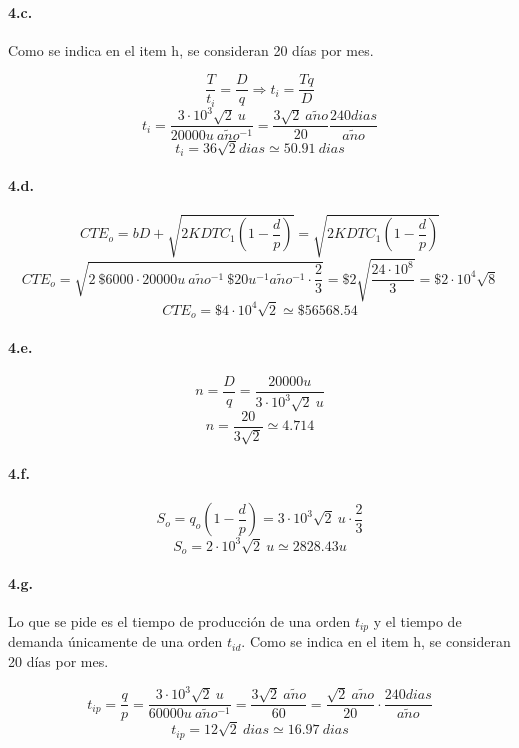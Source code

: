 \documentclass{article}
\def \anio {a\tilde{n}o}
\begin{document}
    \paragraph{4.c.}
        Como se indica en el item h, se consideran 20 días por mes.
        
        $$ \frac{T}{t_i} = \frac{D}{q} \Rightarrow t_i = \frac{Tq}{D} $$
        $$ t_i = \frac{3 \cdot 10^3 \sqrt{2}\ u}{20000u\ \anio^{-1}} = \frac{3 \sqrt{2}\ \anio}{20} \frac{240 dias}{\anio} $$
        $$ \boxed{ t_i = 36 \sqrt{2} dias \simeq 50.91\ dias } $$
    
    \paragraph{4.d.}
        $$ CTE_o = bD + \sqrt{ 2KDTC_1 \left( 1 - \frac{d}{p} \right) } = \sqrt{ 2KDTC_1 \left( 1 - \frac{d}{p} \right) } $$
        $$ CTE_o = \sqrt{ 2\ \$6000 \cdot 20000u\ \anio^{-1}\ \$20u^{-1}\anio^{-1} \cdot \frac{2}{3} } = \$2 \sqrt{ \frac{24 \cdot 10^8}{3} } = \$2 \cdot 10^4 \sqrt{8} $$
        $$ \boxed{ CTE_o = \$4 \cdot 10^4 \sqrt{2} \simeq \$ 56568.54 } $$

    \paragraph{4.e.}
        $$ n = \frac{D}{q} = \frac{20000u}{3 \cdot 10^3 \sqrt{2}\ u} $$
        $$ \boxed{ n = \frac{20}{3 \sqrt{2}} \simeq 4.714 } $$
    
    \paragraph{4.f.}
        $$ S_o = q_o \left( 1 - \frac{d}{p} \right) = 3 \cdot 10^3 \sqrt {2}\ u \cdot \frac{2}{3} $$
        $$ \boxed{ S_o = 2 \cdot 10^3 \sqrt {2}\ u \simeq 2828.43 u } $$
    
    \paragraph{4.g.}
        Lo que se pide es el tiempo de producción de una orden $ t_{ip} $ y el tiempo de demanda únicamente de una orden $ t_{id} $. Como se indica en el item h, se consideran 20 días por mes.
        
        $$ t_{ip} = \frac{q}{p} = \frac{3 \cdot 10^3 \sqrt {2}\ u}{60000u\ \anio^{-1}} = \frac{3 \sqrt {2}\ \anio}{60} = \frac{\sqrt{2}\ \anio}{20} \cdot \frac{240dias}{\anio}$$
        $$ \boxed{ t_{ip} = 12\sqrt{2}\ dias \simeq 16.97\ dias } $$
        
\end{document}
